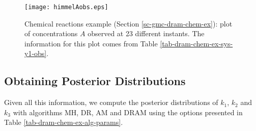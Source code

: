 \begin{figure}[h!]
\begin{center}
\texttt{[image: himmelAobs.eps]}
\end{center}
\caption{Chemical reactions example (Section \ref{sc-gmc-dram-chem-ex}):
plot of concentrations $A$ observed at 23 different instants.
The information for this plot comes from Table \ref{tab-dram-chem-ex-sys-y1-obs}.
}
\label{fig-dram-chem-ex-sys-y1-obs}
\end{figure}

\clearpage
\subsection{Obtaining Posterior Distributions}

Given all this information, we compute the posterior distributions of $k_1$, $k_2$ and $k_3$ with algorithms MH, DR, AM and DRAM using the options presented in
Table \ref{tab-dram-chem-ex-alg-params}.

